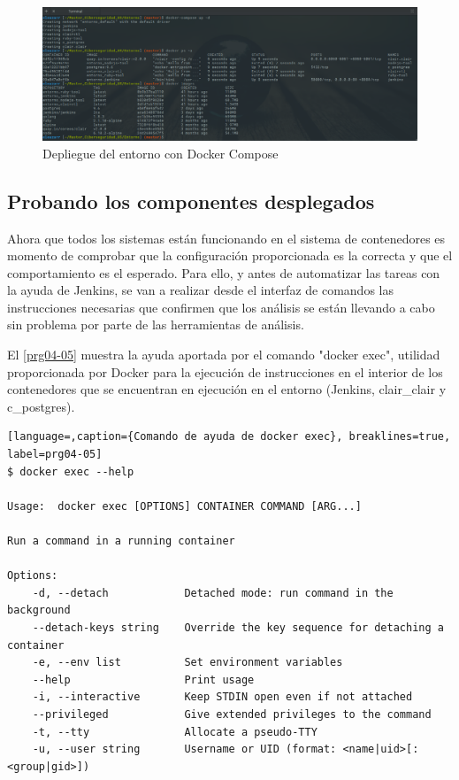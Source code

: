 \begin{figure}[htbp]
	\centering
	\includegraphics[width=1.0\linewidth]
	{desarrollo/figuras/docker-compose-up.png}
	\caption{Depliegue del entorno con Docker Compose}
	\label{compose}
\end{figure}

\subsection{Probando los componentes desplegados}\label{probando}

Ahora que todos los sistemas están funcionando en el sistema de contenedores es momento de comprobar que la configuración proporcionada es la correcta y que el comportamiento es el esperado. Para ello, y antes de automatizar las tareas con la ayuda de Jenkins, se van a realizar desde el interfaz de comandos las instrucciones necesarias que confirmen que los análisis se están llevando a cabo sin problema por parte de las herramientas de análisis.

El \autoref{prg04-05} muestra la ayuda aportada por el comando "docker exec", utilidad proporcionada por Docker para la ejecución de instrucciones en el interior de los contenedores que se encuentran en ejecución en el entorno (Jenkins, clair\_clair y c\_postgres).

\begin{lstlisting}[language=,caption={Comando de ayuda de docker exec}, breaklines=true, label=prg04-05]
$ docker exec --help

Usage:	docker exec [OPTIONS] CONTAINER COMMAND [ARG...]

Run a command in a running container

Options:
	-d, --detach            Detached mode: run command in the background
	--detach-keys string   	Override the key sequence for detaching a container
	-e, --env list          Set environment variables
	--help                 	Print usage
	-i, --interactive       Keep STDIN open even if not attached
	--privileged           	Give extended privileges to the command
	-t, --tty               Allocate a pseudo-TTY
	-u, --user string       Username or UID (format: <name|uid>[:<group|gid>])
\end{lstlisting}

